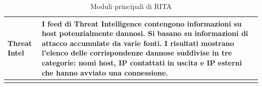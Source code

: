 \begin{center}
\begin{longtable}{|p{}|p{}|}
    Threat Intel & 
    I feed di Threat Intelligence contengono informazioni su host potenzialmente dannosi. 
    Si basano su informazioni di attacco accumulate da varie fonti.
    I risultati mostrano l'elenco delle corrispondenze dannose suddivise in tre categorie: %
    nomi host, IP contattati %
    in uscita e IP esterni che hanno avviato una connessione. %
    \\
    \hline 
\caption{Moduli principali di RITA} 
\label{tabella:RITA:moduliPrincipali} 
\end{longtable} 
\end{center}  
%



